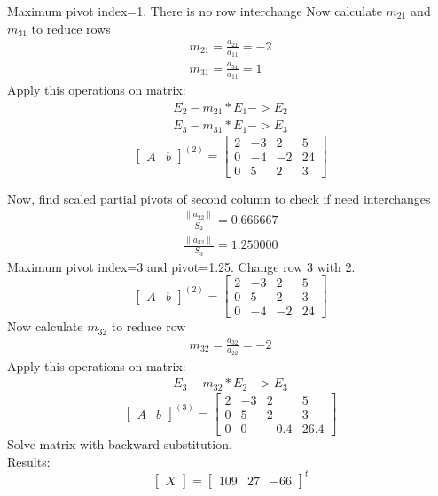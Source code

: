 \documentclass{article}
\begin{document}
Maximum pivot index=1. There is no row interchange
Now calculate $m_{21}$ and $m_{31}$ to reduce rows 
\begin{align}
	m_{21}=\frac{a_{21}}{a_{11}}=-2\\
	m_{31}=\frac{a_{31}}{a_{11}}=1
\end{align}
Apply this operations on matrix:
\begin{align}
	E_{2}-m_{21}*E_{1}->E_{2}\\
	E_{3}-m_{31}*E_{1}->E_{3}
\end{align}
\[
\left[
\begin{array}{c|c}
A&b
\end{array}
\right]^{(2)}
=
\left[
\begin{array}{ccc|c}
	2&-3&2&5\\
	0&-4&-2&24\\
	0&5&2&3 
\end{array}
\right]
\]

Now, find scaled partial pivots of second column to check if need interchanges
\begin{align}
	\frac{\|a_{22}\|}{S_{2}}=0.666667\\
	\frac{\|a_{32}\|}{S_{3}}=1.250000
\end{align}
Maximum pivot index=3 and pivot=1.25. Change row 3 with 2.
\[
\left[
\begin{array}{c|c}
A&b
\end{array}
\right]^{(2)}
=
\left[
\begin{array}{ccc|c}
	2&-3&2&5\\
	0&5&2&3\\
	0&-4&-2&24
\end{array}
\right]
\]
Now calculate $m_{32}$ to reduce row 
\begin{align}
	m_{32}=\frac{a_{32}}{a_{22}}=-2
\end{align}
Apply this operations on matrix:
\begin{align}
	E_{3}-m_{32}*E_{2}->E_{3}
\end{align}
\[
\left[
\begin{array}{c|c}
A&b
\end{array}
\right]^{(3)}
=
\left[
\begin{array}{ccc|c}
	2&-3&2&5\\
	0&5&2&3\\
	0&0&-0.4&26.4 
\end{array}
\right]
\]
Solve matrix with backward substitution.\\
Results:
\[
\begin{bmatrix}
X
\end{bmatrix}
=
\begin{bmatrix}
	109&27&-66
\end{bmatrix}^t
\]
\end{document}
